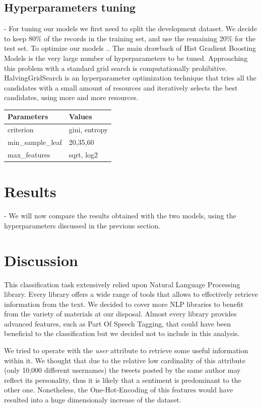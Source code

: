 \documentclass[conference]{IEEEtran}
\begin{document}
\subsection{Hyperparameters tuning}\label{sec:hypertuning}
- For tuning our models we first need to split the development dataset. We decide to keep 80\% of the records in the training set, and use the remaining 20\% for the test set. To optimize our models ..
The main drawback of Hist Gradient Boosting Models is the very large number of hyperparameters to be tuned. Approaching this problem with a standard grid search is computationally prohibitive. HalvingGridSearch is an hyperparameter optimization technique that tries all the candidates with a small amount of resources and iteratively selects the best candidates, using more and more resources.


\begin{table}[]
\begin{tabular}{@{}ll@{}}
\toprule
\textbf{Parameters}                    & \textbf{  Values} \\ \midrule
\multicolumn{1}{l|}{criterion}         & gini, entropy   \\
\multicolumn{1}{l|}{min\_sample\_leaf} & 20,35,60        \\
\multicolumn{1}{l|}{max\_features}     & sqrt, log2      \\ \bottomrule
\end{tabular}
\end{table}

\section{Results}\label{sec:results}
- We will now compare the results obtained with the two models, using the hyperparameters discussed in the previous section.
\section{Discussion}\label{sec:discussion}
This classification task extensively relied upon Natural Language Processing library. Every library offers a wide range of tools that allows to effectively retrieve information from the text. We decided to cover more NLP libraries to benefit from the variety of materials at our disposal. Almost every library provides advanced features, such as Part Of Speech Tagging, that could have been beneficial to the classification but we decided not to include in this analysis. 

We tried to operate with the \textit{user} attribute to retrieve some useful information within it. We thought that due to the relative low cardinality of this attribute (only 10,000 different usernames) the tweets posted by the same author may reflect its personality, thus it is likely that a sentiment is predominant to the other one. Nonetheless, the One-Hot-Encoding\cite{ohe} of this features would have resulted into a huge dimensionaly increase of the dataset.
\end{document}

